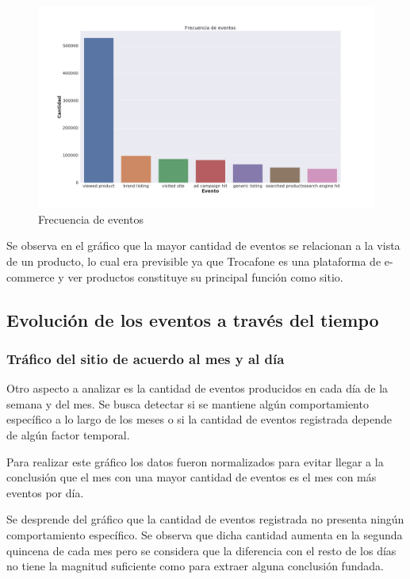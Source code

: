 \documentclass[a4paper]{article}
\begin{document}
\begin{figure}[h!]
	\includegraphics[width=\textwidth]{figures/02-eventos-barplot.png}
	\caption{Frecuencia de eventos}
	\label{fig:freqeventos}
\end{figure}

Se observa en el gráfico que la mayor cantidad de eventos se relacionan a la vista de un producto, lo cual era previsible ya que Trocafone es una plataforma de e-commerce y ver productos constituye su principal función como sitio.

\subsection{Evolución de los eventos a través del tiempo}

\subsubsection{Tráfico del sitio de acuerdo al mes y al día}

Otro aspecto a analizar es la cantidad de eventos producidos en cada día de la semana y del mes. Se busca detectar si se mantiene algún comportamiento específico a lo largo de los meses o si la cantidad de eventos registrada depende de algún factor temporal.

Para realizar este gráfico los datos fueron normalizados para evitar llegar a la conclusión que el mes con una mayor cantidad de eventos es el mes con más eventos por día. 

Se desprende del gráfico que la cantidad de eventos registrada no presenta ningún comportamiento específico. Se observa que dicha cantidad aumenta en la segunda quincena de cada mes pero se considera que la diferencia con el resto de los días no tiene la magnitud suficiente como para extraer alguna conclusión fundada. 
\end{document}
